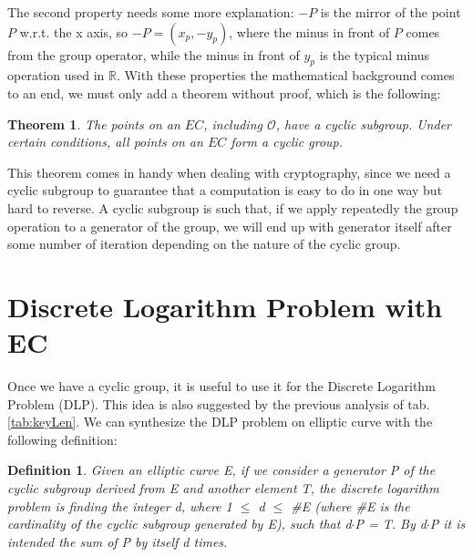 \documentclass{article}
\newtheorem*{remark}{Theorem}
\newtheorem*{definition}{Definition}
\begin{document}
The second property needs some more explanation: $-P$ is the mirror of the point $P$ w.r.t. the x axis, so $-P = (x_p, -y_p)$, where the minus in front of $P$ comes from the group operator, while the minus in front of $y_p$ is the typical minus operation used in $\mathbb{R}$. With these properties the mathematical background comes to an end, we must only add a theorem without proof, which is the following:

\begin{remark}
	The points on an $EC$, including $\mathcal{O}$, have a cyclic subgroup. Under certain conditions, all points on an $EC$ form a cyclic group.
\end{remark} 

This theorem comes in handy when dealing with cryptography, since we need a cyclic subgroup to guarantee that a computation is easy to do in one way but hard to reverse. A cyclic subgroup is such that, if we apply repeatedly the group operation to a generator of the group, we will end up with generator itself after some number of iteration depending on the nature of the cyclic group.


\section{Discrete Logarithm Problem with EC}

Once we have a cyclic group, it is useful to use it for the Discrete Logarithm Problem (DLP). This idea is also suggested by the previous analysis of tab. \ref{tab:keyLen}.\newline
We can synthesize the DLP problem on elliptic curve with the following definition:

\begin{definition}
	Given an elliptic curve E, if we consider a generator P of the cyclic subgroup derived from E and another element T, the discrete logarithm problem is finding the integer d, where 1 $\leq$ d $\leq$ \#E (where \#E is the cardinality of the cyclic subgroup generated by E), such that d$\cdot$P = T. By d$\cdot$P it is intended the sum of P by itself d times.
\end{definition}
\end{document}
